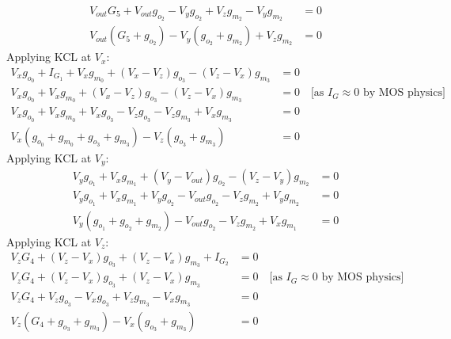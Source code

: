 \begin{enumerate}
\begin{align*}
      V_{out}G_5 + V_{out}g_{o_2} - V_{y}g_{o_2} + V_{z}g_{m_2} - V_{y}g_{m_2} &= 0 \\
      V_{out}(G_5 + g_{o_2}) - V_{y}(g_{o_2} + g_{m_2}) + V_{z}g_{m_2} &= 0 \tag{9}
    \end{align*}
    Applying KCL at $V_{x}$:
    \begin{align*}
      V_{x}g_{o_0} + I_{G_1} + V_{x}g_{m_0} + (V_{x} - V_{z})g_{o_3} - (V_{z} - V_{x})g_{m_3} &= 0 \\
      V_{x}g_{o_0} + V_{x}g_{m_0} + (V_{x} - V_{z})g_{o_3} - (V_{z} - V_{x})g_{m_3} &= 0 \quad \text{[as } I_{G} \approx 0 \text{ by MOS physics]} \\
      V_{x}g_{o_0} + V_{x}g_{m_0} + V_{x}g_{o_3} - V_{z}g_{o_3} - V_{z}g_{m_3} + V_{x}g_{m_3} &= 0 \\
      V_{x}(g_{o_0} + g_{m_0} + g_{o_3} + g_{m_3}) - V_{z}(g_{o_3} + g_{m_3}) &= 0 \tag{10}
    \end{align*}
    Applying KCL at $V_{y}$:
    \begin{align*}
      V_{y}g_{o_1} + V_{x}g_{m_1} + (V_{y} - V_{out})g_{o_2} - (V_{z} - V_{y})g_{m_2} &= 0 \\
      V_{y}g_{o_1} + V_{x}g_{m_1} + V_{y}g_{o_2} - V_{out}g_{o_2} - V_{z}g_{m_2} + V_{y}g_{m_2} &= 0 \\
      V_{y}(g_{o_1} + g_{o_2} + g_{m_2}) - V_{out}g_{o_2} - V_{z}g_{m_2} + V_{x}g_{m_1} &= 0 \tag{11}
    \end{align*}
    Applying KCL at $V_{z}$:
    \begin{align*}
      V_{z}G_4 + (V_{z} - V_{x})g_{o_3} + (V_{z} - V_{x})g_{m_3} + I_{G_2} &= 0 \\
      V_{z}G_4 + (V_{z} - V_{x})g_{o_3} + (V_{z} - V_{x})g_{m_3} &= 0 \quad \text{[as } I_{G} \approx 0 \text{ by MOS physics]} \\
      V_{z}G_4 + V_{z}g_{o_3} - V_{x}g_{o_3} + V_{z}g_{m_3} - V_{x}g_{m_3} &= 0 \\
      V_{z}(G_4 + g_{o_3} + g_{m_3}) - V_{x}(g_{o_3} + g_{m_3}) &= 0 \tag{12}
    \end{align*}

\end{enumerate}
